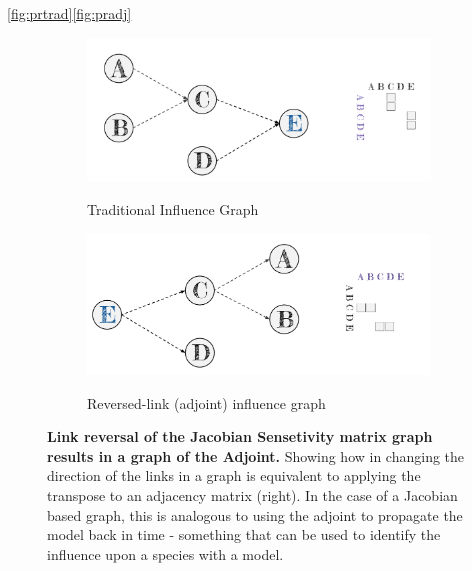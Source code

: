 \autoref{fig:prtrad}\autoref{fig:pradj}




\begin{figure}[H]
    \centering
\begin{subfigure}{.9\textwidth}
  \centering
  \includegraphics[width=\textwidth]{figures_c3/traditional.pdf}
  \label{fig:prtrad}
  \caption{Traditional Influence Graph}
\end{subfigure}

\begin{subfigure}{.9\textwidth }
  \centering
  \includegraphics[width=\textwidth]{figures_c3/adjoint.pdf}
  \label{fig:pradj}
  \caption{Reversed-link (adjoint) influence graph}
\end{subfigure}

\caption{\textbf{Link reversal of the Jacobian Sensetivity matrix graph results in a graph of the Adjoint.} Showing how in changing the direction of the links in a graph is equivalent to applying the transpose to an adjacency matrix (right). In the case of a Jacobian based graph, this is analogous to using the adjoint to propagate the model back in time - something that can be used to identify the influence upon a species with a model.}
\end{figure}





